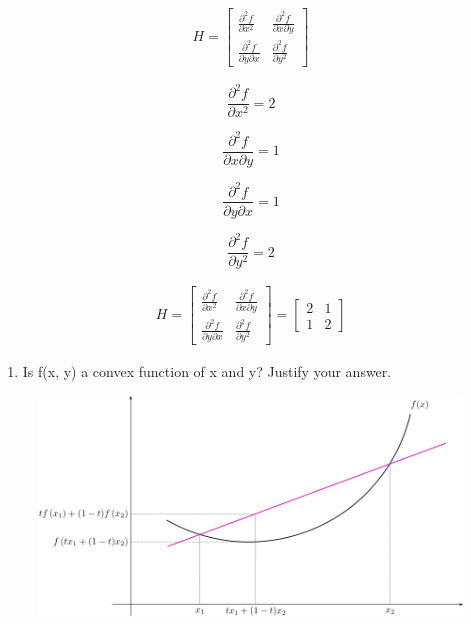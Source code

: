 \documentclass[11pt]{article}
\makeatletter
\def\maxwidth{\ifdim\Gin@nat@width>\linewidth\linewidth
    \else\Gin@nat@width\fi}
\let\Oldincludegraphics\includegraphics
\renewcommand{\includegraphics}[1]{\Oldincludegraphics[width=.8\maxwidth]{#1}}
\providecommand{\tightlist}{%
      \setlength{\itemsep}{0pt}\setlength{\parskip}{0pt}}
\makeatother
\begin{document}
    \begin{align} H=
\begin{bmatrix} \frac{\partial^2 f}{\partial x^2}
 & \frac{\partial^2 f}{\partial x \partial y}\\ 
 \frac{\partial^2 f}{\partial y \partial x} 
 & \frac{\partial^2 f}{\partial y^2}
\end{bmatrix}
\end{align}

\[\frac{\partial^2 f}{\partial x^2} = 2\]

\[\frac{\partial^2 f}{\partial x \partial y} = 1\]

\[\frac{\partial^2 f}{\partial y \partial x} = 1\]

\[\frac{\partial^2 f}{\partial y^2} = 2\]

\begin{align} H=
\begin{bmatrix} \frac{\partial^2 f}{\partial x^2}
 & \frac{\partial^2 f}{\partial x \partial y}\\ 
 \frac{\partial^2 f}{\partial y \partial x} 
 & \frac{\partial^2 f}{\partial y^2}
\end{bmatrix} = 
\begin{bmatrix} 2
 & 1\\ 
1 
 & 2
\end{bmatrix}
\end{align}

    \begin{enumerate}
\def\labelenumi{(\alph{enumi})}
\setcounter{enumi}{2}
\tightlist
\item
  Is f(x, y) a convex function of x and y? Justify your answer.
\end{enumerate}

    \begin{figure}[htbp]
\centering
\includegraphics{../../images/convex.png}
\caption{}
\end{figure}
\end{document}
